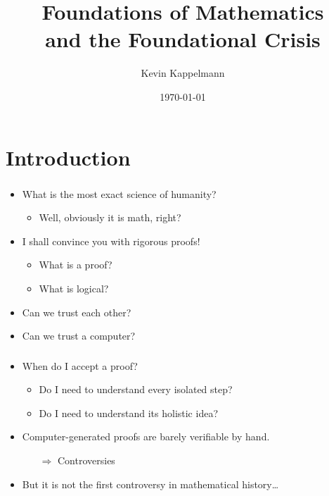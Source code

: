 \documentclass{beamer}
\title[Mathematical Foundations and the Foundational Crisis]{Foundations of Mathematics\\and the Foundational Crisis} %
\author{Kevin Kappelmann} %
\institute[TUM] %
{Technical University of Munich}
\date{\today} %
\begin{document}
\begin{frame}
\titlepage %
\end{frame}

\section*{Introduction}

\begin{frame}
    \frametitle{}
    \begin{itemize}[<+->]
	\item What is the most exact science of humanity?
	\begin{itemize}
		\item Well, obviously it is math, right?
	\end{itemize}
	\item I shall convince you with rigorous proofs!
	\begin{itemize}
		\item What is a proof?
		\item What is logical?
	\end{itemize}
	\item Can we trust each other?
	\item Can we trust a computer?
    \end{itemize}
\end{frame}

\begin{frame}
    \frametitle{}
    \begin{itemize}[<+->]
	\item When do I accept a proof?
	\begin{itemize}
		\item Do I need to understand every isolated step?
		\item Do I need to understand its holistic idea?
	\end{itemize}
	\item Computer-generated proofs are barely verifiable by hand.
	\begin{itemize}
		\item[$\Rightarrow$] Controversies
	\end{itemize}
	\item But it is not the first controversy in mathematical history\ldots
    \end{itemize}
\end{frame}
\end{document}

